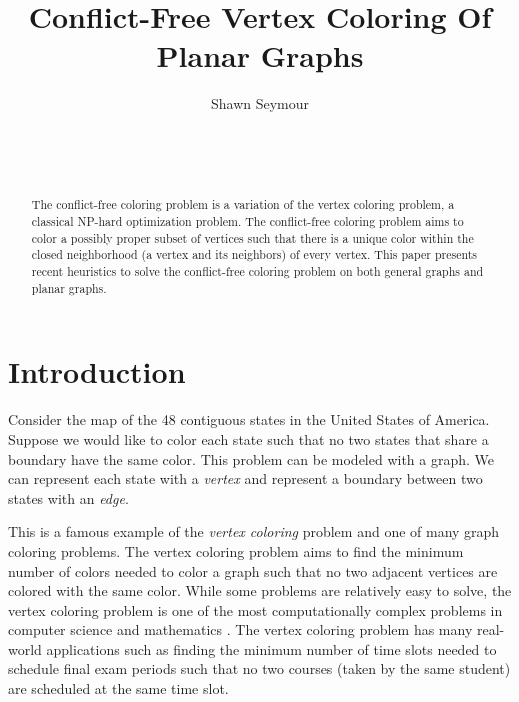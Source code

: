 \documentclass{sig-alternate}
\begin{document}

\title{Conflict-Free Vertex Coloring Of Planar Graphs}


\author{
\alignauthor
Shawn Seymour\\
	\\
	\\
	\\
}

\maketitle
\begin{abstract}
The conflict-free coloring problem is a variation of the vertex coloring problem, a classical NP-hard optimization problem. The conflict-free coloring problem aims to color a possibly proper subset of vertices such that there is a unique color within the closed neighborhood (a vertex and its neighbors) of every vertex. This paper presents recent heuristics to solve the conflict-free coloring problem on both general graphs and planar graphs.
\end{abstract}

\section{Introduction}
\label{sec:introduction}

Consider the map of the 48 contiguous states in the United States of America. Suppose we would like to color each state such that no two states that share a boundary have the same color. This problem can be modeled with a graph. We can represent each state with a \emph{vertex} and represent a boundary between two states with an \emph{edge}.

This is a famous example of the \emph{vertex coloring} problem and one of many graph coloring problems. The vertex coloring problem aims to find the minimum number of colors needed to color a graph such that no two adjacent vertices are colored with the same color. While some problems are relatively easy to solve, the vertex coloring problem is one of the most computationally complex problems in computer science and mathematics \cite{bondy1976graph}. The vertex coloring problem has many real-world applications such as finding the minimum number of time slots needed to schedule final exam periods such that no two courses (taken by the same student) are scheduled at the same time slot.
\end{document}
